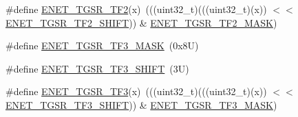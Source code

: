 \begin{DoxyCompactItemize}
\item 
\#define \mbox{\hyperlink{group___e_n_e_t___register___masks_ga728ca624d5b29012c3050e87fd0eb7e4}{E\+N\+E\+T\+\_\+\+T\+G\+S\+R\+\_\+\+T\+F2}}(x)~(((uint32\+\_\+t)(((uint32\+\_\+t)(x)) $<$$<$ \mbox{\hyperlink{group___e_n_e_t___register___masks_ga8b692cdc1ae33167e75fc033385ea3f2}{E\+N\+E\+T\+\_\+\+T\+G\+S\+R\+\_\+\+T\+F2\+\_\+\+S\+H\+I\+FT}})) \& \mbox{\hyperlink{group___e_n_e_t___register___masks_ga3bb5da9c3f3c88fc7784149aaf536e0c}{E\+N\+E\+T\+\_\+\+T\+G\+S\+R\+\_\+\+T\+F2\+\_\+\+M\+A\+SK}})
\item 
\#define \mbox{\hyperlink{group___e_n_e_t___register___masks_ga6346ae30393bacdf198cc24bbb538c4c}{E\+N\+E\+T\+\_\+\+T\+G\+S\+R\+\_\+\+T\+F3\+\_\+\+M\+A\+SK}}~(0x8\+U)
\item 
\#define \mbox{\hyperlink{group___e_n_e_t___register___masks_gaf027fca605976ae3ebfc79ba1ba3f0e4}{E\+N\+E\+T\+\_\+\+T\+G\+S\+R\+\_\+\+T\+F3\+\_\+\+S\+H\+I\+FT}}~(3\+U)
\item 
\#define \mbox{\hyperlink{group___e_n_e_t___register___masks_gaecbaccbc03057609ebe1d9881a41acf7}{E\+N\+E\+T\+\_\+\+T\+G\+S\+R\+\_\+\+T\+F3}}(x)~(((uint32\+\_\+t)(((uint32\+\_\+t)(x)) $<$$<$ \mbox{\hyperlink{group___e_n_e_t___register___masks_gaf027fca605976ae3ebfc79ba1ba3f0e4}{E\+N\+E\+T\+\_\+\+T\+G\+S\+R\+\_\+\+T\+F3\+\_\+\+S\+H\+I\+FT}})) \& \mbox{\hyperlink{group___e_n_e_t___register___masks_ga6346ae30393bacdf198cc24bbb538c4c}{E\+N\+E\+T\+\_\+\+T\+G\+S\+R\+\_\+\+T\+F3\+\_\+\+M\+A\+SK}})
\end{DoxyCompactItemize}
